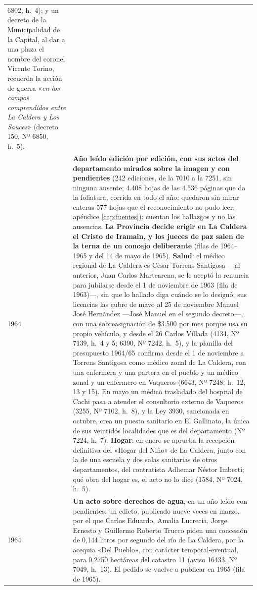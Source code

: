\begin{longtable}{@{}p{2.7cm}p{10.3cm}@{}}
6802, h.\ 4); y un decreto de la Municipalidad de la Capital, al dar a una plaza el nombre del coronel Vicente Torino, recuerda la acción de guerra «\textit{en los campos comprendidos entre La Caldera y Los Sauces}» (decreto 150, Nº 6850, h.\ 5). \\
1964 & \textbf{Año leído edición por edición, con sus actos del departamento mirados sobre la imagen y con pendientes} (242 ediciones, de la 7010 a la 7251, sin ninguna ausente; 4.408 hojas de las 4.536 páginas que da la foliatura, corrida en todo el año; quedaron sin mirar enteras 577 hojas que el reconocimiento no pudo leer; apéndice \ref{cap:fuentes}): cuentan los hallazgos y no las ausencias. \textbf{La Provincia decide erigir en La Caldera el Cristo de Iramain, y los jueces de paz salen de la terna de un concejo deliberante} (filas de 1964--1965 y del 14 de mayo de 1965). \textbf{Salud}: el médico regional de La Caldera es César Torrens Santigosa ---al anterior, Juan Carlos Martearena, se le aceptó la renuncia para jubilarse desde el 1 de noviembre de 1963 (fila de 1963)---, sin que lo hallado diga cuándo se lo designó; sus licencias las cubre de mayo al 25 de noviembre Manuel José Hernández ---José Manuel en el segundo decreto---, con una sobreasignación de \$3.500 por mes porque usa su propio vehículo, y desde el 26 Carlos Villada (4134, Nº 7139, h.\ 4 y 5; 6390, Nº 7242, h.\ 5), y la planilla del presupuesto 1964/65 confirma desde el 1 de noviembre a Torrens Santigosa como médico zonal de La Caldera, con una enfermera y una partera en el pueblo y un médico zonal y un enfermero en Vaqueros (6643, Nº 7248, h.\ 12, 13 y 15). En mayo un médico trasladado del hospital de Cachi pasa a atender el consultorio externo de Vaqueros (3255, Nº 7102, h.\ 8), y la Ley 3930, sancionada en octubre, crea un puesto sanitario en El Gallinato, la única de sus veintidós localidades que es del departamento (Nº 7224, h.\ 7). \textbf{Hogar}: en enero se aprueba la recepción definitiva del «Hogar del Niño» de La Caldera, junto con la de una escuela y dos salas sanitarias de otros departamentos, del contratista Adhemar Néstor Imberti; qué obra del hogar es, el acto no lo dice (1584, Nº 7024, h.\ 5). \\
1964 & \textbf{Un acto sobre derechos de agua}, en un año leído con pendientes: un edicto, publicado nueve veces en marzo, por el que Carlos Eduardo, Amalia Lucrecia, Jorge Ernesto y Guillermo Roberto Trucco piden una concesión de 0,144 litros por segundo del río de La Caldera, por la acequia «Del Pueblo», con carácter temporal-eventual, para 0,2750 hectáreas del catastro 11 (aviso 16433, Nº 7049, h.\ 13). El pedido se vuelve a publicar en 1965 (fila de 1965). \\

\end{longtable}
